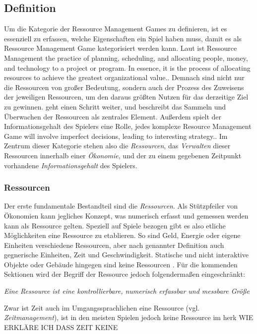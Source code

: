\subsection{Definition}

Um die Kategorie der Ressource Management Games zu definieren, ist es essenziell zu erfassen, welche Eigenschaften ein Spiel haben muss, damit es als Ressource Management Game kategorisiert werden kann. Laut \cite*[]{definition:ressourcemanagement} ist Ressource Management \glqq [...] the practice of planning, scheduling, and allocating people, money, and technology to a project or program. In essence, it is the process of allocating resources to achieve the greatest organizational value.\grqq. Demnach sind nicht nur die Ressourcen von großer Bedeutung, sondern auch der Prozess des Zuweisens der jeweiligen Ressourcen, um den daraus größten Nutzen für das derzeitige Ziel zu gewinnen. \cite*[]{definition:ressourcemanagementfandom} geht einen Schritt weiter, und beschreibt das Sammeln und Überwachen der Ressourcen als zentrales Element. Außerdem spielt der Informationsgehalt des Spielers eine Rolle, jedes komplexe Resource Management Game \glqq [...] will involve imperfect decisions, leading to interesting strategy.\grqq \cite*[]{definition:ressourcemanagementfandom}. 
Im Zentrum dieser Kategorie stehen also die \textit{Ressourcen}, das \textit{Verwalten} dieser Ressourcen innerhalb einer \textit{Ökonomie}, und der zu einem gegebenen Zeitpunkt vorhandene \textit{Informationsgehalt} des Spielers.

\subsubsection{Ressourcen}
Der erste fundamentale Bestandteil sind die \textit{Ressourcen}. Als Stützpfeiler von Ökonomien kann jegliches Konzept, was numerisch erfasst und gemessen werden kann als Ressource gelten. Speziell auf Spiele bezogen gibt es also etliche Möglichkeiten eine Ressource zu etablieren. So sind Geld, Energie oder eigene Einheiten verschiedene Ressourcen, aber nach genannter Definition auch gegnerische Einheiten, Zeit und Geschwindigkeit. Statische und nicht interaktive Objekte oder Gebäude hingegen sind keine Ressourcen \cite*[]{book:gamedesign:resources}. Für die kommenden Sektionen wird der Begriff der Ressource jedoch folgendermaßen eingeschränkt:
\begin{center}
    \textit{Eine Ressource ist eine kontrollierbare, numerisch erfassbar und messbare Größe}
\end{center}
Zwar ist Zeit auch im Umgangssprachlichen eine Ressource (vgl. \textit{\glqq Zeitmanagement\grqq}), ist in den meisten Spielen jedoch keine Ressource im herk WIE ERKLÄRE ICH DASS ZEIT KEINE 

